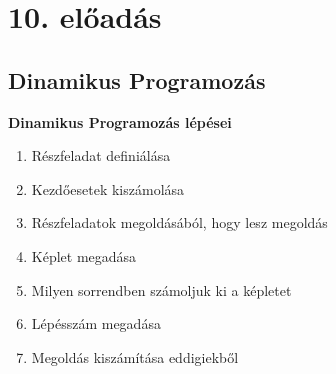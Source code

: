 \section{10. előadás}

\subsection{Dinamikus Programozás}

\textbf{Dinamikus Programozás lépései}
	\begin{enumerate}[itemsep=0 mm]
		\item Részfeladat definiálása
		\item Kezdőesetek kiszámolása
		\item Részfeladatok megoldásából, hogy lesz megoldás
		\item Képlet megadása
		\item Milyen sorrendben számoljuk ki a képletet
		\item Lépésszám megadása
		\item Megoldás kiszámítása eddigiekből
	\end{enumerate}
